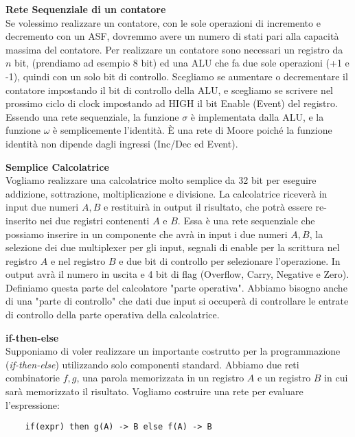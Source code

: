 \begin{exmp}
	\textbf{Rete Sequenziale di un contatore} \\
	Se volessimo realizzare un contatore, con le sole operazioni di incremento e
	decremento con un ASF, dovremmo avere un numero di stati pari alla capacità
	massima del contatore. Per realizzare un contatore sono necessari un
	registro da $ n $ bit, (prendiamo ad esempio 8 bit) ed una ALU che fa due
	sole operazioni (+1 e -1), quindi con un solo bit di controllo. Scegliamo se
	aumentare o decrementare il contatore impostando il bit di controllo della
	ALU, e scegliamo se scrivere nel prossimo ciclo di clock impostando ad HIGH
	il bit Enable (Event) del registro. Essendo una rete sequenziale, la
	funzione $ \sigma $ è implementata dalla ALU, e la funzione $ \omega $ è
	semplicemente l'identità. È una rete di Moore poiché la funzione identità
	non dipende dagli ingressi (Inc/Dec ed Event).
	
\end{exmp}


\begin{exmp}
	\textbf{Semplice Calcolatrice} \\
	Vogliamo realizzare una calcolatrice molto semplice da 32 bit per eseguire
	addizione, sottrazione, moltiplicazione e divisione. La calcolatrice
	riceverà in input due numeri $ A,B $ e restituirà in output il risultato,
	che potrà essere re-inserito nei due registri contenenti $ A $ e $ B $. Essa
	è una rete sequenziale che possiamo inserire in un componente che avrà in
	input i due numeri $ A,B $, la selezione dei due multiplexer per gli input,
	segnali di enable per la scrittura nel registro $ A $ e nel registro $ B $ e
	due bit di controllo per selezionare l'operazione. In output avrà il numero
	in uscita e 4 bit di flag (Overflow, Carry, Negative e Zero). Definiamo
	questa parte del calcolatore "parte operativa". Abbiamo bisogno anche di una
	"parte di controllo" che dati due input si occuperà di controllare le
	entrate di controllo della parte operativa della calcolatrice.
	
\end{exmp}


\begin{defn}
	\textbf{if-then-else} \\
	Supponiamo di voler realizzare un importante costrutto per la programmazione
	(\textit{if-then-else}) utilizzando solo componenti standard. Abbiamo due
	reti combinatorie $ f,g $, una parola memorizzata in un registro $ A $ e un
	registro $ B $ in cui sarà memorizzato il risultato. Vogliamo costruire una
	rete per evaluare l'espressione:

	\begin{Verbatim}
	if(expr) then g(A) -> B else f(A) -> B
	\end{Verbatim}
	
\end{defn}


